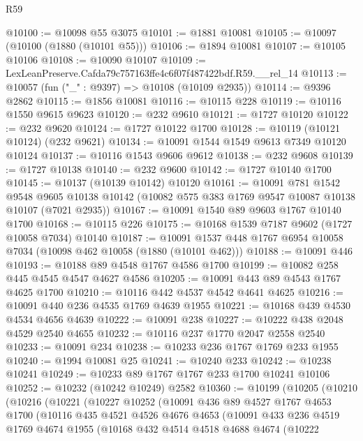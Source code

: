 \begin{lexlean}{R59}
\begin{coremodule}
@10100 := @10098 @55 @3075
@10101 := @1881 @10081
@10105 := @10097 (@10100 (@1880 (@10101 @55)))
@10106 := @1894 @10081
@10107 := @10105 @10106
@10108 := @10090 @10107
@10109 := LexLeanPreserve.Cafda79c757163ffe4c6f07f487422bdf.R59.__rel_14
@10113 := @10057 (fun ("_" : @9397) => @10108 (@10109 @2935))
@10114 := @9396 @2862
@10115 := @1856 @10081
@10116 := @10115 @228
@10119 := @10116 @1550 @9615 @9623
@10120 := @232 @9610
@10121 := @1727 @10120
@10122 := @232 @9620
@10124 := @1727 @10122 @1700
@10128 := @10119 (@10121 @10124) (@232 @9621)
@10134 := @10091 @1544 @1549 @9613 @7349 @10120 @10124
@10137 := @10116 @1543 @9606 @9612
@10138 := @232 @9608
@10139 := @1727 @10138
@10140 := @232 @9600
@10142 := @1727 @10140 @1700
@10145 := @10137 (@10139 @10142) @10120
@10161 := @10091
    @781
    @1542
    @9548
    @9605
    @10138
    @10142
    (@10082 @575 @383 @1769 @9547 @10087 @10138 @10107 (@7021 @2935))
@10167 := @10091 @1540 @89 @9603 @1767 @10140 @1700
@10168 := @10115 @226
@10175 := @10168 @1539 @7187 @9602 (@1727 @10058 @7034) @10140
@10187 := @10091 @1537 @448 @1767 @6954 @10058 @7034 (@10098 @462 @10058 (@1880 (@10101 @462)))
@10188 := @10091 @446
@10193 := @10188 @89 @4548 @1767 @4586 @1700
@10199 := @10082 @258 @445 @4545 @4547 @4627 @4586
@10205 := @10091 @443 @89 @4543 @1767 @4625 @1700
@10210 := @10116 @442 @4537 @4542 @4641 @4625
@10216 := @10091 @440 @236 @4535 @1769 @4639 @1955
@10221 := @10168 @439 @4530 @4534 @4656 @4639
@10222 := @10091 @238
@10227 := @10222 @438 @2048 @4529 @2540 @4655
@10232 := @10116 @237 @1770 @2047 @2558 @2540
@10233 := @10091 @234
@10238 := @10233 @236 @1767 @1769 @233 @1955
@10240 := @1994 @10081 @25
@10241 := @10240 @233
@10242 := @10238 @10241
@10249 := @10233 @89 @1767 @1767 @233 @1700 @10241 @10106
@10252 := @10232 (@10242 @10249) @2582
@10360 := @10199
    (@10205
      (@10210
        (@10216
          (@10221
            (@10227
              @10252
              (@10091
                @436
                @89
                @4527
                @1767
                @4653
                @1700
                (@10116
                  @435
                  @4521
                  @4526
                  @4676
                  @4653
                  (@10091
                    @433
                    @236
                    @4519
                    @1769
                    @4674
                    @1955
                    (@10168
                      @432
                      @4514
                      @4518
                      @4688
                      @4674
                      (@10222

\end{coremodule}
\end{lexlean}
